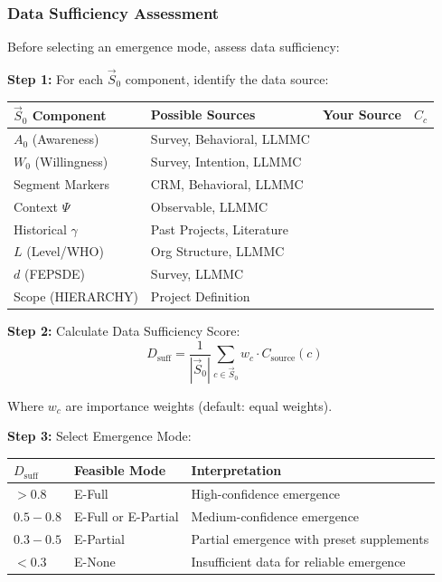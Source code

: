\subsubsection{Data Sufficiency Assessment}

Before selecting an emergence mode, assess data sufficiency:

\begin{tcolorbox}[colback=green!5!white, colframe=green!75!black,
    title=\textbf{Protocol: Data Sufficiency Score}]

\textbf{Step 1:} For each $\vec{S}_0$ component, identify the data source:

\begin{center}
\footnotesize
\renewcommand{\arraystretch}{1.2}
\begin{tabular}{@{}lllc@{}}
\toprule
\textbf{$\vec{S}_0$ Component} & \textbf{Possible Sources} & \textbf{Your Source} & \textbf{$C_c$} \\
\midrule
$A_0$ (Awareness) & Survey, Behavioral, LLMMC & & \\
$W_0$ (Willingness) & Survey, Intention, LLMMC & & \\
Segment Markers & CRM, Behavioral, LLMMC & & \\
Context $\Psi$ & Observable, LLMMC & & \\
Historical $\gamma$ & Past Projects, Literature & & \\
$L$ (Level/WHO) & Org Structure, LLMMC & & \\
$d$ (FEPSDE) & Survey, LLMMC & & \\
Scope (HIERARCHY) & Project Definition & & \\
\bottomrule
\end{tabular}
\end{center}

\textbf{Step 2:} Calculate Data Sufficiency Score:
\begin{equation}
\boxed{D_{\text{suff}} = \frac{1}{|\vec{S}_0|} \sum_{c \in \vec{S}_0} w_c \cdot C_{\text{source}}(c)}
\label{eq:hhh-data-sufficiency}
\end{equation}

Where $w_c$ are importance weights (default: equal weights).

\textbf{Step 3:} Select Emergence Mode:
\begin{center}
\renewcommand{\arraystretch}{1.2}
\begin{tabular}{@{}lll@{}}
\toprule
\textbf{$D_{\text{suff}}$} & \textbf{Feasible Mode} & \textbf{Interpretation} \\
\midrule
$> 0.8$ & E-Full & High-confidence emergence \\
$0.5 - 0.8$ & E-Full or E-Partial & Medium-confidence emergence \\
$0.3 - 0.5$ & E-Partial & Partial emergence with preset supplements \\
$< 0.3$ & E-None & Insufficient data for reliable emergence \\
\bottomrule
\end{tabular}
\end{center}
\end{tcolorbox}

